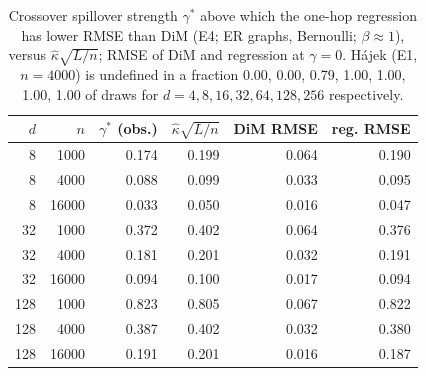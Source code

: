 \begin{table}[t]\centering\footnotesize
\caption{Crossover spillover strength $\gamma^\ast$ above which the one-hop regression has lower RMSE than DiM (E4; ER graphs, Bernoulli; $\beta\approx1$), versus $\hat\kappa\sqrt{L/n}$; RMSE of DiM and regression at $\gamma=0$. H\'ajek (E1, $n=4000$) is undefined in a fraction 0.00, 0.00, 0.79, 1.00, 1.00, 1.00, 1.00 of draws for $d=4,8,16,32,64,128,256$ respectively.}
\label{tab:cross}\begin{tabular}{rrrrrr}\toprule
$d$ & $n$ & $\gamma^\ast$ (obs.) & $\hat\kappa\sqrt{L/n}$ & DiM RMSE & reg. RMSE \\
\midrule
8 & 1000 & 0.174 & 0.199 & 0.064 & 0.190 \\
8 & 4000 & 0.088 & 0.099 & 0.033 & 0.095 \\
8 & 16000 & 0.033 & 0.050 & 0.016 & 0.047 \\
32 & 1000 & 0.372 & 0.402 & 0.064 & 0.376 \\
32 & 4000 & 0.181 & 0.201 & 0.032 & 0.191 \\
32 & 16000 & 0.094 & 0.100 & 0.017 & 0.094 \\
128 & 1000 & 0.823 & 0.805 & 0.067 & 0.822 \\
128 & 4000 & 0.387 & 0.402 & 0.032 & 0.380 \\
128 & 16000 & 0.191 & 0.201 & 0.016 & 0.187 \\
\bottomrule\end{tabular}\end{table}
